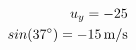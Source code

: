 \documentclass[preview]{standalone}
\begin{document}
\begin{align*}
\special{dvisvgm:raw <g id='unique000'>}u_y = -25\\sin(37^{\circ}) = -15\,\mathrm{m/s}\special{dvisvgm:raw </g>}
\end{align*}
\end{document}
